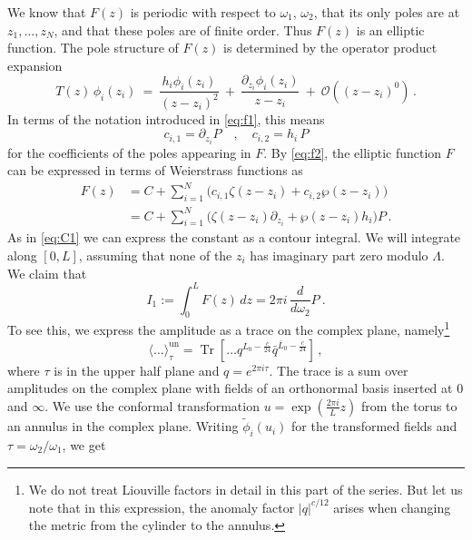 \documentclass[11pt,a4paper]{article}
\numberwithin{equation}{section}
\DeclareMathOperator{\Tr}{Tr}
\begin{document}
We know that $F(z)$ is periodic with respect to $\omega_1$, $\omega_2$, that its only poles are at $z_1,\dots,z_N$, and that these poles are of finite order. Thus $F(z)$ is an elliptic function. The pole structure of $F(z)$ is determined by the operator product expansion
\begin{equation}
    T(z)\,\phi_i(z_i)  ~=~ \frac{h_i \phi_i(z_i)}{(z-z_i)^2} ~+~ \frac{\partial_{z_i}\phi_i(z_i)}{z-z_i} ~+~ \mathcal{O}\!\left(\left(z-z_i\right)^0\right)\,.
\end{equation}
In terms of the notation introduced in \eqref{eq:f1}, this means
%
\begin{equation}\label{eq:corr-expansion-values}
    c_{i,1} = \partial_{z_i} P
    \quad , \quad
    c_{i,2} = h_i \, P
\end{equation}
%
for the coefficients of the poles appearing in $F$. 
By \eqref{eq:f2}, the elliptic function $F$ can be expressed in terms of Weierstrass functions as
%
\begin{align}
    F(z) &= C + \sum_{i=1}^N \Big( c_{i,1}\zeta(z-z_i) + c_{i,2} \wp(z-z_i) \Big)
    \nonumber \\
    &=C + \sum_{i=1}^N \Big( \zeta(z-z_i) \partial_{z_i} + \wp(z-z_i) h_i\Big) P \,.
    \label{eq:T-corr-with-constant}
\end{align}
As in \eqref{eq:C1} we can express the constant as a contour integral. We will integrate along $[0,L]$, assuming that none of the $z_i$ has imaginary part zero modulo $\Lambda$. We claim that
\begin{equation}\label{eq:intT2}
I_1 := \int_0^L F(z) \, dz = 2\pi i \,\frac{d}{d\omega_2} P~.
\end{equation}
To see this, we express the amplitude as a trace on the complex plane, namely\footnote{
    We do not treat Liouville factors in detail in this part of the series. But let us note that in this expression, the anomaly factor $|q|^{c/12}$ arises when changing the metric from the cylinder to the annulus.
    }
%
\begin{equation}
\big\langle\dots\big\rangle_\tau^\mathrm{un} = \Tr\left[\dots q^{L_0-\frac{c}{24}}\bar{q}^{\bar{L}_0-\frac{c}{24}}\right]\,,
\end{equation}
%
where $\tau$ is in the upper half plane and $q = e^{2 \pi i \tau}$. The trace is a sum over amplitudes on the complex plane with fields of an orthonormal basis inserted at $0$ and $\infty$. We use the conformal transformation $u = \exp(\frac{2\pi i}{L} z)$ from the torus to an annulus in the complex plane. Writing $\tilde\phi_i(u_i)$ for the transformed fields and $\tau = \omega_2/\omega_1$, we get
\end{document}
